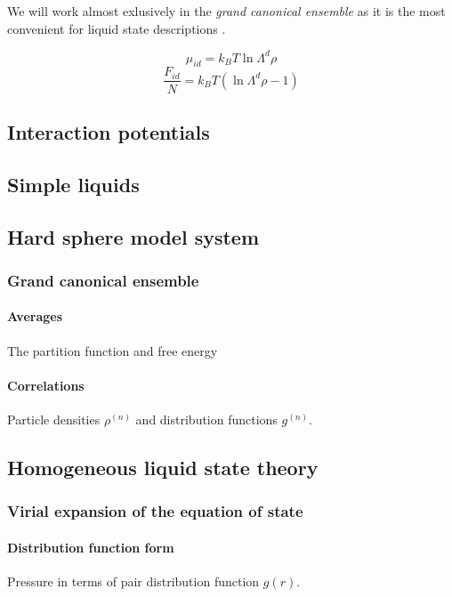 We will work almost exlusively in the \emph{grand canonical ensemble} as it is the most convenient for liquid state descriptions%
.

\begin{equation}
  \mu_{id} = k_B T \ln{\Lambda^d \rho}
\end{equation}
\begin{equation}
  \frac{F_{id}}{N} = k_B T (\ln{\Lambda^d \rho} - 1)
\end{equation}

\subsection{Interaction potentials}
\subsection{Simple liquids}
\subsection{Hard sphere model system}

\subsubsection{Grand canonical ensemble}
\paragraph{Averages}
The partition function and free energy
\paragraph{Correlations}
Particle densities $\rho^{(n)}$ and distribution functions $g^{(n)}$.

\subsection{Homogeneous liquid state theory}

\subsubsection{Virial expansion of the equation of state}

\paragraph{Distribution function form}
Pressure in terms of pair distribution function $g(r)$.

